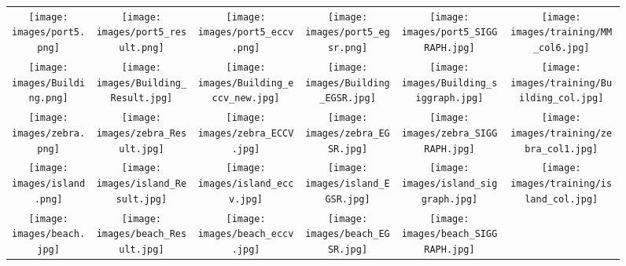 \documentclass[twocolumn]{svjour3}          %
\begin{document}
\begin{figure*}\center
\begin{minipage}[t]{\linewidth}
\centering
\begin{tabular}{c@{\hspace{.7mm}} c@{\hspace{0.7mm}} c@{\hspace{0.7mm}} c@{\hspace{0.7mm}} c@{\hspace{0.7mm}} |c@{\hspace{0mm}}}
\texttt{[image: images/port5.png]}&
\texttt{[image: images/port5\_result.png]}&
\texttt{[image: images/port5\_eccv.png]}&
\texttt{[image: images/port5\_egsr.png]}&
\texttt{[image: images/port5\_SIGGRAPH.jpg]}&
\texttt{[image: images/training/MM\_col6.jpg]}\\
\texttt{[image: images/Building.png]}&
\texttt{[image: images/Building\_Result.jpg]}&
\texttt{[image: images/Building\_eccv\_new.jpg]}&
\texttt{[image: images/Building\_EGSR.jpg]}&
\texttt{[image: images/Building\_siggraph.jpg]}&
\texttt{[image: images/training/Building\_col.jpg]}\\
\texttt{[image: images/zebra.png]}&
\texttt{[image: images/zebra\_Result.jpg]}&
\texttt{[image: images/zebra\_ECCV.jpg]}&
\texttt{[image: images/zebra\_EGSR.jpg]}&
\texttt{[image: images/zebra\_SIGGRAPH.jpg]}&
\texttt{[image: images/training/zebra\_col1.jpg]}\\
\texttt{[image: images/island.png]}&
\texttt{[image: images/island\_Result.jpg]}&
\texttt{[image: images/island\_eccv.jpg]}&
\texttt{[image: images/island\_EGSR.jpg]}&
\texttt{[image: images/island\_siggraph.jpg]}&
\texttt{[image: images/training/island\_col.jpg]}\\
\texttt{[image: images/beach.jpg]}&
\texttt{[image: images/beach\_Result.jpg]}&
\texttt{[image: images/beach\_eccv.jpg]}&
\texttt{[image: images/beach\_EGSR.jpg]}&
\texttt{[image: images/beach\_SIGGRAPH.jpg]}&

\end{tabular}
\end{minipage}
\end{figure*}
\end{document}
